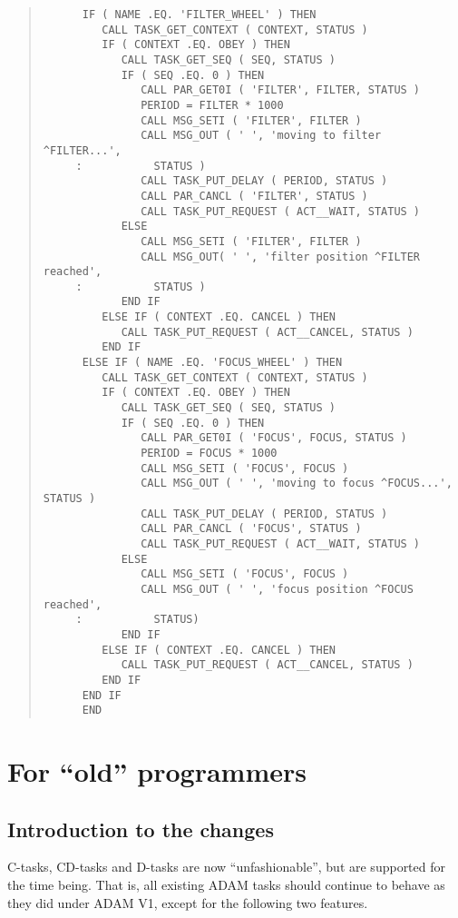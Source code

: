 \documentclass[twoside,11pt]{article}
\newcommand{\xlabel}[1]{}
\renewcommand{\_}{\texttt{\symbol{95}}}
\begin{document}
\begin{quote}
\begin{verbatim}
      IF ( NAME .EQ. 'FILTER_WHEEL' ) THEN
         CALL TASK_GET_CONTEXT ( CONTEXT, STATUS )
         IF ( CONTEXT .EQ. OBEY ) THEN
            CALL TASK_GET_SEQ ( SEQ, STATUS )
            IF ( SEQ .EQ. 0 ) THEN
               CALL PAR_GET0I ( 'FILTER', FILTER, STATUS )
               PERIOD = FILTER * 1000
               CALL MSG_SETI ( 'FILTER', FILTER )
               CALL MSG_OUT ( ' ', 'moving to filter ^FILTER...', 
     :           STATUS )
               CALL TASK_PUT_DELAY ( PERIOD, STATUS )
               CALL PAR_CANCL ( 'FILTER', STATUS )
               CALL TASK_PUT_REQUEST ( ACT__WAIT, STATUS )
            ELSE
               CALL MSG_SETI ( 'FILTER', FILTER )
               CALL MSG_OUT( ' ', 'filter position ^FILTER reached',
     :           STATUS )
            END IF
         ELSE IF ( CONTEXT .EQ. CANCEL ) THEN
            CALL TASK_PUT_REQUEST ( ACT__CANCEL, STATUS )
         END IF
      ELSE IF ( NAME .EQ. 'FOCUS_WHEEL' ) THEN
         CALL TASK_GET_CONTEXT ( CONTEXT, STATUS )
         IF ( CONTEXT .EQ. OBEY ) THEN
            CALL TASK_GET_SEQ ( SEQ, STATUS )
            IF ( SEQ .EQ. 0 ) THEN
               CALL PAR_GET0I ( 'FOCUS', FOCUS, STATUS )
               PERIOD = FOCUS * 1000
               CALL MSG_SETI ( 'FOCUS', FOCUS )
               CALL MSG_OUT ( ' ', 'moving to focus ^FOCUS...', STATUS )
               CALL TASK_PUT_DELAY ( PERIOD, STATUS )
               CALL PAR_CANCL ( 'FOCUS', STATUS )
               CALL TASK_PUT_REQUEST ( ACT__WAIT, STATUS )
            ELSE
               CALL MSG_SETI ( 'FOCUS', FOCUS )
               CALL MSG_OUT ( ' ', 'focus position ^FOCUS reached',
     :           STATUS)
            END IF
         ELSE IF ( CONTEXT .EQ. CANCEL ) THEN
            CALL TASK_PUT_REQUEST ( ACT__CANCEL, STATUS )
         END IF
      END IF
      END
\end{verbatim} \end{quote} \normalsize

\newpage

\section{\xlabel{for_old_programmers}\label{old}For ``old'' programmers}

\subsection{Introduction to the changes}

C-tasks, CD-tasks and D-tasks are now ``unfashionable'', but are supported
for the time being. That is, all existing ADAM tasks should continue to 
behave as they did under ADAM V1, except for the following two features. 
\end{document}
